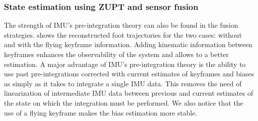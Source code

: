 \subsubsection{State estimation using ZUPT and sensor fusion}

The strength of IMU's pre-integration theory can also be found in the fusion strategies. 
 shows the reconstructed foot trajectories for the two cases: without and with the flying keyframe information. Adding kinematic information between keyframes enhances the observability of the system and allows to a better estimation.
A major advantage of IMU's pre-integration theory is the ability to use past pre-integrations corrected with current estimates of keyframes and biases as simply as it takes to integrate a single IMU data. This removes the need of linearization of
intermediate IMU data between previous and current estimates of the state on which the integration must be performed. We also notice that the use of a flying keyframe makes the bias estimation more stable.



